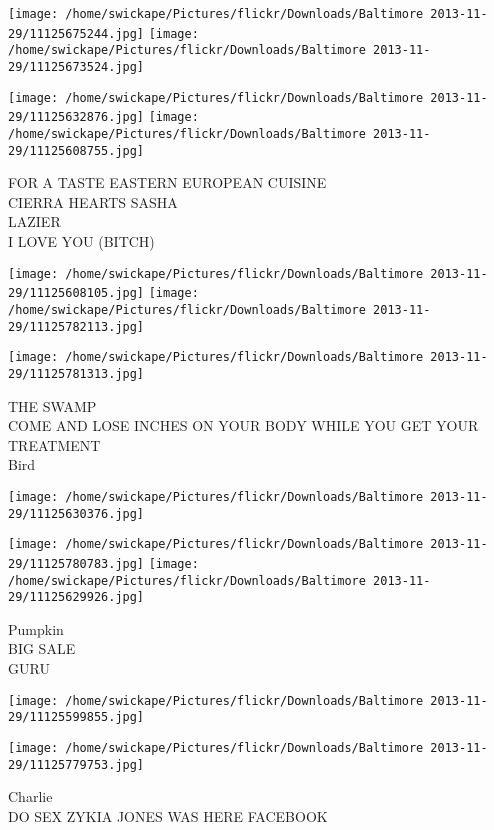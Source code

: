 \documentclass[10pt,letterpaper]{article}
\begin{document}
\texttt{[image: /home/swickape/Pictures/flickr/Downloads/Baltimore 2013-11-29/11125675244.jpg]}
\texttt{[image: /home/swickape/Pictures/flickr/Downloads/Baltimore 2013-11-29/11125673524.jpg]}

\texttt{[image: /home/swickape/Pictures/flickr/Downloads/Baltimore 2013-11-29/11125632876.jpg]}
\texttt{[image: /home/swickape/Pictures/flickr/Downloads/Baltimore 2013-11-29/11125608755.jpg]}

FOR A TASTE EASTERN EUROPEAN CUISINE\\
CIERRA HEARTS SASHA\\
LAZIER\\
I LOVE YOU (BITCH)\\
\pagebreak

\texttt{[image: /home/swickape/Pictures/flickr/Downloads/Baltimore 2013-11-29/11125608105.jpg]}
\texttt{[image: /home/swickape/Pictures/flickr/Downloads/Baltimore 2013-11-29/11125782113.jpg]}

\texttt{[image: /home/swickape/Pictures/flickr/Downloads/Baltimore 2013-11-29/11125781313.jpg]}

THE SWAMP\\
COME AND LOSE INCHES ON YOUR BODY WHILE YOU GET YOUR TREATMENT\\
Bird\\
\pagebreak

\texttt{[image: /home/swickape/Pictures/flickr/Downloads/Baltimore 2013-11-29/11125630376.jpg]}

\vspace{0.25in}
\texttt{[image: /home/swickape/Pictures/flickr/Downloads/Baltimore 2013-11-29/11125780783.jpg]}
\texttt{[image: /home/swickape/Pictures/flickr/Downloads/Baltimore 2013-11-29/11125629926.jpg]}

Pumpkin\\
BIG SALE\\
GURU\\
\pagebreak

\texttt{[image: /home/swickape/Pictures/flickr/Downloads/Baltimore 2013-11-29/11125599855.jpg]}

\vspace{0.25in}
\texttt{[image: /home/swickape/Pictures/flickr/Downloads/Baltimore 2013-11-29/11125779753.jpg]}

Charlie\\
DO SEX ZYKIA JONES WAS HERE FACEBOOK\\
\pagebreak
\end{document}
